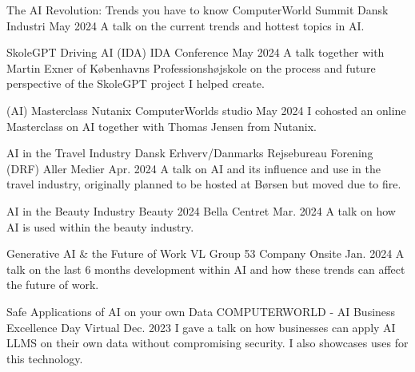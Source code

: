 

\begin{cventries}

    \cventry
    {The AI Revolution: Trends you have to know} %
    {ComputerWorld Summit} %
    {Dansk Industri} %
    {May 2024} %
    {
      A talk on the current trends and hottest topics in AI.
    }

    \cventry
    {SkoleGPT} %
    {Driving AI (IDA)} %
    {IDA Conference} %
    {May 2024} %
    {
      A talk together with Martin Exner of Københavns Professionshøjskole on the process and future perspective of the SkoleGPT project I helped create.
    }

    \cventry
    {(AI) Masterclass} %
    {Nutanix} %
    {ComputerWorlds studio} %
    {May 2024} %
    {
      I cohosted an online Masterclass on AI together with Thomas Jensen from Nutanix.
    }

    \cventry
    {AI in the Travel Industry} %
    {Dansk Erhverv/Danmarks Rejsebureau Forening (DRF)} %
    {Aller Medier} %
    {Apr. 2024} %
    {
      A talk on AI and its influence and use in the travel industry, originally planned to be hosted at Børsen but moved due to fire.
    }

    \cventry
    {AI in the Beauty Industry} %
    {Beauty 2024} %
    {Bella Centret} %
    {Mar. 2024} %
    {
      A talk on how AI is used within the beauty industry.
    }

    \cventry
    {Generative AI \& the Future of Work} %
    {VL Group 53} %
    {Company Onsite} %
    {Jan. 2024} %
    {
      A talk on the last 6 months development within AI and how these trends can affect the future of work.
    }


    \cventry
    {Safe Applications of AI on your own Data} %
    {COMPUTERWORLD - AI Business Excellence Day} %
    {Virtual} %
    {Dec. 2023} %
    {
      I gave a talk on how businesses can apply AI LLMS on their own data without compromising security. I also showcases uses for this technology.
    }


\end{cventries}
